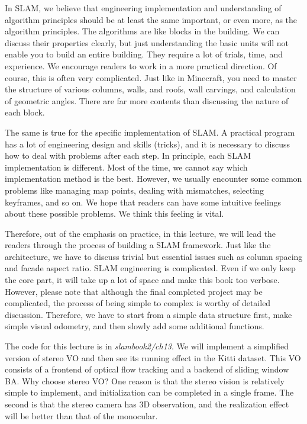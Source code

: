In SLAM, we believe that engineering implementation and understanding of algorithm principles should be at least the same important, or even more, as the algorithm principles. The algorithms are like blocks in the building. We can discuss their properties clearly, but just understanding the basic units will not enable you to build an entire building. They require a lot of trials, time, and experience. We encourage readers to work in a more practical direction. Of course, this is often very complicated. Just like in Minecraft, you need to master the structure of various columns, walls, and roofs, wall carvings, and calculation of geometric angles. There are far more contents than discussing the nature of each block.

The same is true for the specific implementation of SLAM. A practical program has a lot of engineering design and skills (tricks), and it is necessary to discuss how to deal with problems after each step. In principle, each SLAM implementation is different. Most of the time, we cannot say which implementation method is the best. However, we usually encounter some common problems like managing map points, dealing with mismatches, selecting keyframes, and so on. We hope that readers can have some intuitive feelings about these possible problems. We think this feeling is vital.

Therefore, out of the emphasis on practice, in this lecture, we will lead the readers through the process of building a SLAM framework. Just like the architecture, we have to discuss trivial but essential issues such as column spacing and facade aspect ratio. SLAM engineering is complicated. Even if we only keep the core part, it will take up a lot of space and make this book too verbose. However, please note that although the final completed project may be complicated, the process of being simple to complex is worthy of detailed discussion. Therefore, we have to start from a simple data structure first, make simple visual odometry, and then slowly add some additional functions. 

The code for this lecture is in \textit{slambook2/ch13}. We will implement a simplified version of stereo VO and then see its running effect in the Kitti dataset. This VO consists of a frontend of optical flow tracking and a backend of sliding window BA. Why choose stereo VO? One reason is that the stereo vision is relatively simple to implement, and initialization can be completed in a single frame. The second is that the stereo camera has 3D observation, and the realization effect will be better than that of the monocular.

